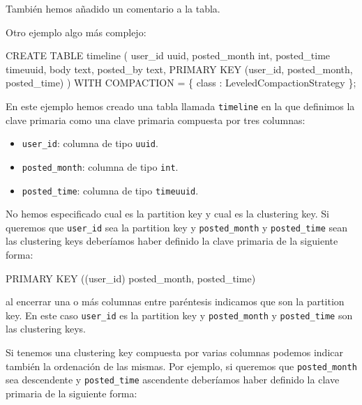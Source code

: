 \documentclass[
]{book}
\newenvironment{Shaded}{}{}
\newcommand{\NormalTok}[1]{#1}
\providecommand{\tightlist}{%
  \setlength{\itemsep}{0pt}\setlength{\parskip}{0pt}}
\begin{document}
También hemos añadido un comentario a la tabla.

Otro ejemplo algo más complejo:

\begin{Shaded}
\begin{Highlighting}[]
\NormalTok{CREATE TABLE timeline (}
\NormalTok{    user\_id uuid,}
\NormalTok{    posted\_month int,}
\NormalTok{    posted\_time timeuuid,}
\NormalTok{    body text,}
\NormalTok{    posted\_by text,}
\NormalTok{    PRIMARY KEY (user\_id, posted\_month, posted\_time)}
\NormalTok{) WITH COMPACTION = \{ \textquotesingle{}class\textquotesingle{} : \textquotesingle{}LeveledCompactionStrategy\textquotesingle{} \};}
\end{Highlighting}
\end{Shaded}

En este ejemplo hemos creado una tabla llamada \texttt{timeline} en la que definimos la clave primaria como una clave primaria compuesta por tres columnas:

\begin{itemize}
\tightlist
\item
  \texttt{user\_id}: columna de tipo \texttt{uuid}.
\item
  \texttt{posted\_month}: columna de tipo \texttt{int}.
\item
  \texttt{posted\_time}: columna de tipo \texttt{timeuuid}.
\end{itemize}

No hemos especificado cual es la partition key y cual es la clustering key. Si queremos que \texttt{user\_id} sea la partition key y \texttt{posted\_month} y \texttt{posted\_time} sean las clustering keys deberíamos haber definido la clave primaria de la siguiente forma:

\begin{Shaded}
\begin{Highlighting}[]
\NormalTok{PRIMARY KEY ((user\_id) posted\_month, posted\_time)}
\end{Highlighting}
\end{Shaded}

al encerrar una o más columnas entre paréntesis indicamos que son la partition key. En este caso \texttt{user\_id} es la partition key y \texttt{posted\_month} y \texttt{posted\_time} son las clustering keys.

Si tenemos una clustering key compuesta por varias columnas podemos indicar también la ordenación de las mismas. Por ejemplo, si queremos que \texttt{posted\_month} sea descendente y \texttt{posted\_time} ascendente deberíamos haber definido la clave primaria de la siguiente forma:
\end{document}
